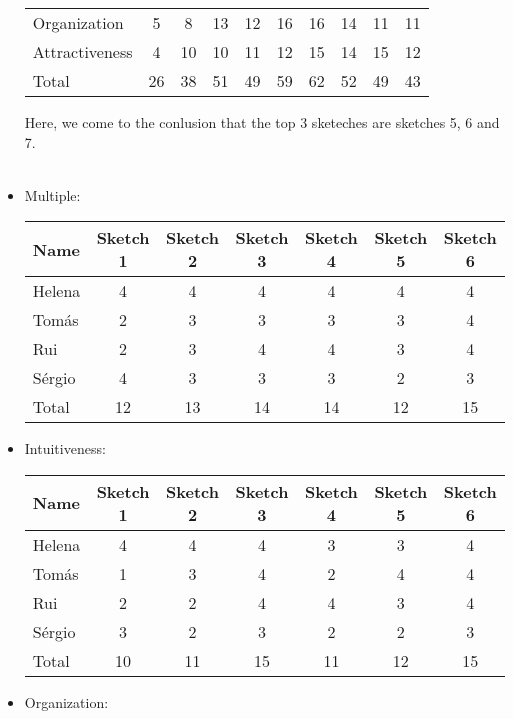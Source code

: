 \begin{itemize}
\begin{table}[H]
\begin{tabular}{l*{9}{c}}
        Organization & 5 & 8 & 13 & 12 & 16 & 16 & 14 & 11 & 11 \\ 
        Attractiveness & 4 & 10 & 10 & 11 & 12 & 15 & 14 & 15 & 12 \\ 
        \hline
        Total & 26 & 38 & 51 & 49 & 59 & 62 & 52 & 49 & 43 \\
    \end{tabular}
\end{table} \par 
Here, we come to the conlusion that the top 3 sketeches are
sketches 5, 6 and 7. \\\\
    \item Multiple:
    \begin{table}[H]
        \begin{tabular}{l*{6}{c}}
            Name & Sketch 1 & Sketch 2 & Sketch 3 & Sketch 4 & Sketch 5 & Sketch 6 \\
            \hline 
            Helena & 4 & 4 & 4 & 4 & 4 & 4 \\
            Tomás & 2 & 3 & 3 & 3 & 3 & 4 \\ 
            Rui & 2 & 3 & 4 & 4 & 3 & 4 \\ 
            Sérgio & 4 & 3 & 3 & 3 & 2 & 3 \\ 
            \hline
            Total & 12 & 13 & 14 & 14 & 12 & 15 \\
        \end{tabular}
        \end{table}
    \item Intuitiveness:
    \begin{table}[H]
        \begin{tabular}{l*{6}{c}}
            Name & Sketch 1 & Sketch 2 & Sketch 3 & Sketch 4 & Sketch 5 & Sketch 6 \\
            \hline 
            Helena & 4 & 4 & 4 & 3 & 3 & 4 \\
            Tomás & 1 & 3 & 4 & 2 & 4 & 4 \\ 
            Rui & 2 & 2 & 4 & 4 & 3 & 4 \\ 
            Sérgio & 3 & 2 & 3 & 2 & 2 & 3 \\ 
            \hline
            Total & 10 & 11 & 15 & 11 & 12 & 15 \\
        \end{tabular}
        \end{table}
    \item Organization: 
    \begin{table}[H]

\end{table}
\end{itemize}
